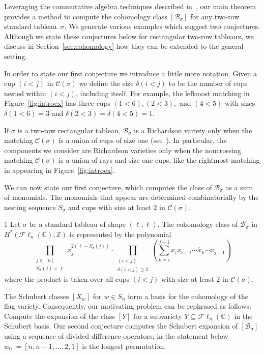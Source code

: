 \documentclass[11pt]{amsart}
\theoremstyle{remark}
\theoremstyle{remark}
\theoremstyle{definition}
\theoremstyle{definition}
\theoremstyle{definition}
\numberwithin{equation}{section}
\newcommand{\C}{\mathbb{C}}           %
\newcommand{\Z}{\mathbb{ Z}}           %
\newcommand{\gd}{\delta}
\newcommand{\gs}{\sigma}
\newcommand{\cb}{\mathcal{B}}
\newcommand{\cc}{\mathcal{C}}
\newcommand{\SF}{\mathcal{B}}
\newcommand{\cupsigma}{\cc(\gs)}
\newcommand{\Fl}{\mathcal{F}\ell}
\begin{document}
Leveraging the commutative algebra techniques described in~\cite{KnutsonMiller2005, ITW18, MillerSturmfels2005}, our main theorem provides a method to compute the cohomology class $[\cb_\gs]$ for any two-row standard tableau~$\gs$. We generate various examples which suggest two conjectures. Although we state these conjectures below for rectangular two-row tableaux, we discuss in Section~\ref{sec:cohomology} how they can be extended to the general setting.





In order to state our first conjecture we introduce a little more notation. Given a cup $(i<j)$ in $\cupsigma$ we define the size $\gd(i<j)$ to be the number of cups nested within $(i<j)$, including itself. For example, the leftmost matching in Figure~\ref{fig:introex} has three cups $(1<6),(2<3),$ and $(4<5)$ with sizes $\gd(1<6)=3$ and $\gd(2<3)=\gd(4<5)=1$. 

If $\gs$ is a two-row rectangular tableau, $\SF_\gs$ is a Richardson variety only when the matching $\cupsigma$ is a union of cups of size one (see~\cite[Remark 3.2(ii)]{KarpPrecup25}). In particular, the components we consider  are Richardson varieties only when the noncrossing matching $\cc(\gs)$ is a union of rays and size one cups, like the rightmost matching in appearing in Figure~\ref{fig:introex}.

We can now state our first conjecture, which computes the class of $\cb_\gs$ as a sum of monomials. The monomials that appear are determined combinatorially by the nesting sequence $S_\gs$ and cups with size at least $2$ in $\cupsigma$. 
\begin{customconj}{1}\label{conj1.intro}
Let $\sigma$ be a standard tableau of shape $(\ell, \ell)$. The cohomology class of $\SF_\gs$ in $H^*(\Fl_n(\C);\Z)$ is represented by the polynomial
\[
\prod_{\substack{j\in [n]\\S_\gs(j)<\ell}} x_j^{2(\ell-S_\gs(j))}  \cdot  \prod_{\substack{(i<j)\\ \gd(i<j)\geq 2}} \left(  \sum_{k=i}^{j-1} x_ix_{i+1}\cdots \hat{x}_k \cdots x_{j-1} \right)  
\]
where the product is taken over all cups $(i<j)$ with size at least $2$ in $\cupsigma$.
\end{customconj}



The Schubert classes $[X_w]$ for $w\in S_n$ form a basis for the cohomology of the flag variety. Consequently, our motivating problem can be rephrased as follows: Compute the expansion of the class $[Y]$ for a subvariety $Y \subseteq \Fl_n(\C)$ in the Schubert basis. Our second conjecture computes the Schubert expansion of $[\SF_\gs]$ using a sequence of divided difference operators; in the statement below $w_0:=[n,n-1, \ldots, 2, 1]$ is the longest permutation. 
\end{document}
